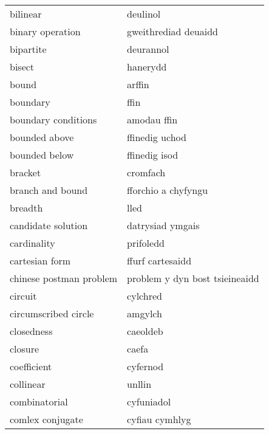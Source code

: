 \begin{supertabular}{p{0.22\textwidth}p{0.22\textwidth}}
                         bilinear &                         deulinol \\
                 binary operation &             gweithrediad deuaidd \\
                        bipartite &                        deurannol \\
                           bisect &                         hanerydd \\
                            bound &                           arffin \\
                         boundary &                             ffin \\
              boundary conditions &                      amodau ffin \\
                    bounded above &                   ffinedig uchod \\
                    bounded below &                    ffinedig isod \\
                          bracket &                         cromfach \\
                 branch and bound &              fforchio a chyfyngu \\
                          breadth &                             lled \\
               candidate solution &                 datrysiad ymgais \\
                      cardinality &                        prifoledd \\
                   cartesian form &                 ffurf cartesaidd \\
          chinese postman problem &   problem y dyn bost tsieineaidd \\
                          circuit &                         cylchred \\
             circumscribed circle &                          amgylch \\
                       closedness &                         caeoldeb \\
                          closure &                            caefa \\
                      coefficient &                         cyfernod \\
                        collinear &                           unllin \\
                    combinatorial &                       cyfuniadol \\
                 comlex conjugate &                   cyfiau cymhlyg \\

\end{supertabular}
